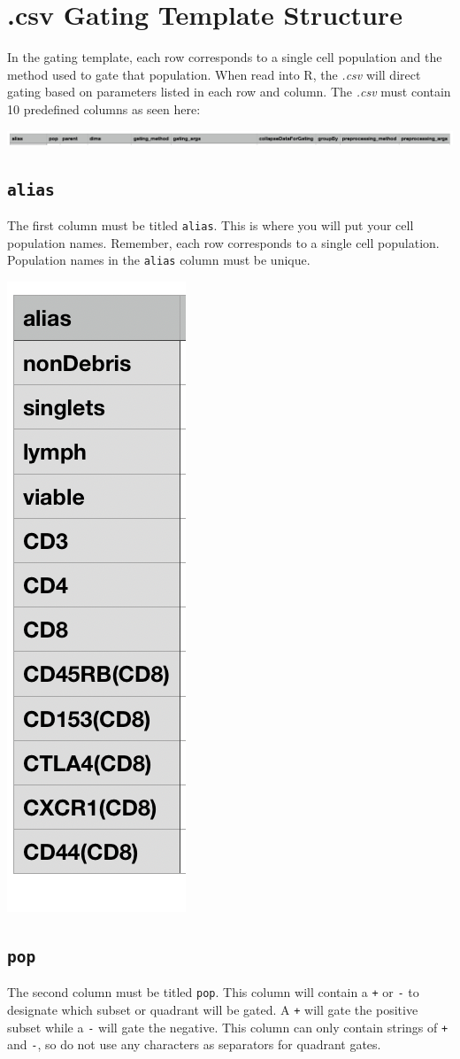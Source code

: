 \documentclass[]{book}
\begin{document}
\hypertarget{csv-gating-template-structure}{%
\section{.csv Gating Template Structure}\label{csv-gating-template-structure}}

In the gating template, each row corresponds to a single cell population and the method used to gate that population. When read into R, the \emph{.csv} will direct gating based on parameters listed in each row and column. The \emph{.csv} must contain 10 predefined columns as seen here:

\includegraphics[width=0.6\linewidth]{../tutorial/images/cols}

\hypertarget{alias}{%
\subsection{\texorpdfstring{\texttt{alias}}{alias}}\label{alias}}

The first column must be titled \texttt{alias}. This is where you will put your cell population names. Remember, each row corresponds to a single cell population. Population names in the \texttt{alias} column must be unique.

\includegraphics[width=0.1\linewidth]{../tutorial/images/alias}

\hypertarget{pop}{%
\subsection{\texorpdfstring{\texttt{pop}}{pop}}\label{pop}}

The second column must be titled \texttt{pop}. This column will contain a \texttt{+} or \texttt{-} to designate which subset or quadrant will be gated. A \texttt{+} will gate the positive subset while a \texttt{-} will gate the negative. This column can only contain strings of \texttt{+} and \texttt{-}, so do not use any characters as separators for quadrant gates.
\end{document}
